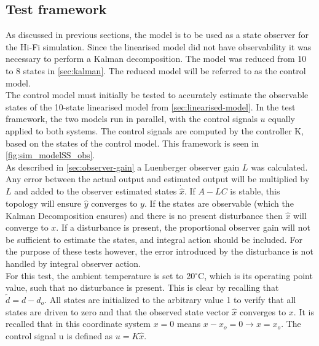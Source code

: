 \subsection{Test framework}
As discussed in previous sections, the model is to be used as a state observer for the Hi-Fi simulation. Since the linearised model did not have observability it was necessary to perform a Kalman decomposition. The model was reduced from 10 to 8 states in \cref{sec:kalman}. The reduced model will be referred to as the control model. \\

\noindent The control model must initially be tested to accurately estimate the observable states of the  10-state linearised model from \cref{sec:linearised-model}. In the test framework, the two models run in parallel, with the control signals $u$ equally applied to both systems. The control signals are computed by the controller K, based on the states of the control model. This framework is seen in \cref{fig:sim_modelSS_obs}. \\

\noindent As described in \cref{sec:observer-gain} a Luenberger observer gain $L$ was calculated. Any error between the actual output and estimated output will be multiplied by $L$ and added to the observer estimated states $\dot{\hat{x}}$. If $A-LC$ is stable, this topology will ensure $\hat{y}$ converges to $y$. If the states are observable (which the Kalman Decomposition ensures) and there is no present disturbance then $\hat{x}$ will converge to $x$. If a disturbance is present, the proportional observer gain will not be sufficient to estimate the states, and integral action should be included. For the purpose of these tests however, the error introduced by the disturbance is not handled by integral observer action. \\

\noindent For this test, the ambient temperature is set to 20$^{\circ}$C, which is its operating point value, such that no disturbance is present. This is clear by recalling that $\tilde{d} = d-d_o$. All states are initialized to the arbitrary value 1 to verify that all states are driven to zero and that the observed state vector $\hat{x}$ converges to $x$. It is recalled that in this coordinate system $x=0$ means $x-x_o = 0 \rightarrow x=x_o$. The control signal u is defined as $u=K\hat{x}$.


